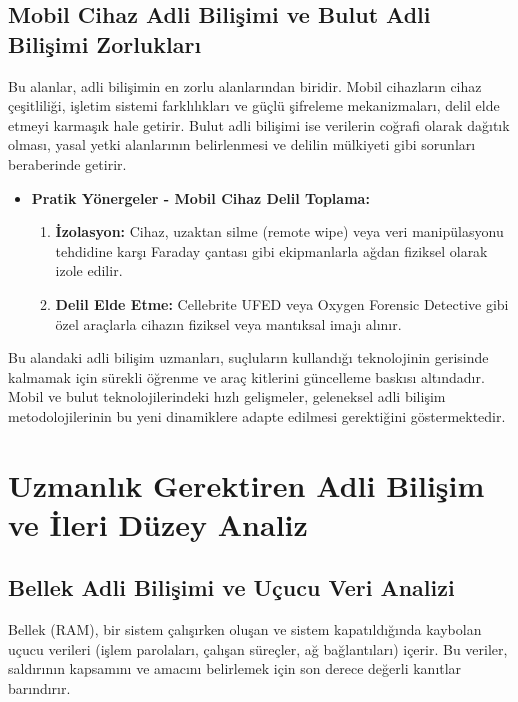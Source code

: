 \subsection{Mobil Cihaz Adli Bilişimi ve Bulut Adli Bilişimi Zorlukları}

Bu alanlar, adli bilişimin en zorlu alanlarından biridir. Mobil cihazların cihaz çeşitliliği, işletim sistemi farklılıkları ve güçlü şifreleme mekanizmaları, delil elde etmeyi karmaşık hale getirir. Bulut adli bilişimi ise verilerin coğrafi olarak dağıtık olması, yasal yetki alanlarının belirlenmesi ve delilin mülkiyeti gibi sorunları beraberinde getirir.

\begin{itemize}
    \item \textbf{Pratik Yönergeler - Mobil Cihaz Delil Toplama:}
    \begin{enumerate}
        \item \textbf{İzolasyon:} Cihaz, uzaktan silme (remote wipe) veya veri manipülasyonu tehdidine karşı Faraday çantası gibi ekipmanlarla ağdan fiziksel olarak izole edilir.
        \item \textbf{Delil Elde Etme:} Cellebrite UFED veya Oxygen Forensic Detective gibi özel araçlarla cihazın fiziksel veya mantıksal imajı alınır.
    \end{enumerate}
\end{itemize}
Bu alandaki adli bilişim uzmanları, suçluların kullandığı teknolojinin gerisinde kalmamak için sürekli öğrenme ve araç kitlerini güncelleme baskısı altındadır. Mobil ve bulut teknolojilerindeki hızlı gelişmeler, geleneksel adli bilişim metodolojilerinin bu yeni dinamiklere adapte edilmesi gerektiğini göstermektedir.

\section{Uzmanlık Gerektiren Adli Bilişim ve İleri Düzey Analiz}

\subsection{Bellek Adli Bilişimi ve Uçucu Veri Analizi}

Bellek (RAM), bir sistem çalışırken oluşan ve sistem kapatıldığında kaybolan uçucu verileri (işlem parolaları, çalışan süreçler, ağ bağlantıları) içerir. Bu veriler, saldırının kapsamını ve amacını belirlemek için son derece değerli kanıtlar barındırır.

